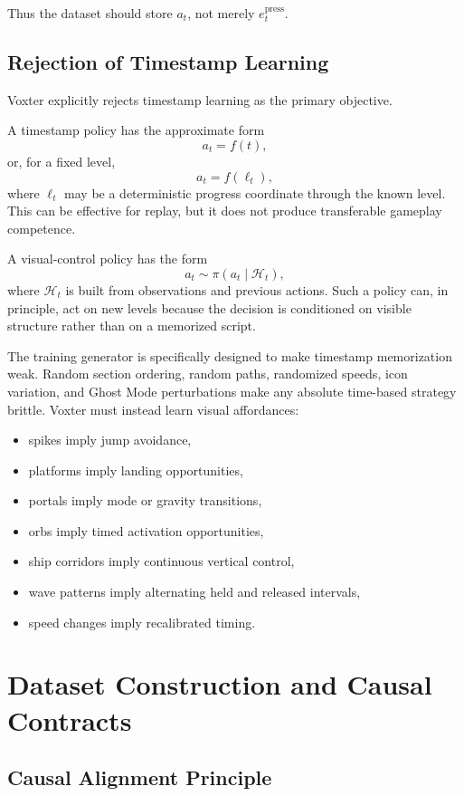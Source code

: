 \documentclass[11pt]{article}
\begin{document}
Thus the dataset should store \(a_t\), not merely \(e_t^{\mathrm{press}}\).

\subsection{Rejection of Timestamp Learning}

Voxter explicitly rejects timestamp learning as the primary objective.

A timestamp policy has the approximate form
\[
  a_t = f(t),
\]
or, for a fixed level,
\[
  a_t = f(\ell_t),
\]
where \(\ell_t\) may be a deterministic progress coordinate through the known level. This can be effective for replay, but it does not produce transferable gameplay competence.

A visual-control policy has the form
\[
  a_t \sim \pi(a_t \mid \mathcal{H}_t),
\]
where \(\mathcal{H}_t\) is built from observations and previous actions. Such a policy can, in principle, act on new levels because the decision is conditioned on visible structure rather than on a memorized script.

The training generator is specifically designed to make timestamp memorization weak. Random section ordering, random paths, randomized speeds, icon variation, and Ghost Mode perturbations make any absolute time-based strategy brittle. Voxter must instead learn visual affordances:
\begin{itemize}
  \item spikes imply jump avoidance,
  \item platforms imply landing opportunities,
  \item portals imply mode or gravity transitions,
  \item orbs imply timed activation opportunities,
  \item ship corridors imply continuous vertical control,
  \item wave patterns imply alternating held and released intervals,
  \item speed changes imply recalibrated timing.
\end{itemize}

\section{Dataset Construction and Causal Contracts}

\subsection{Causal Alignment Principle}
\end{document}

